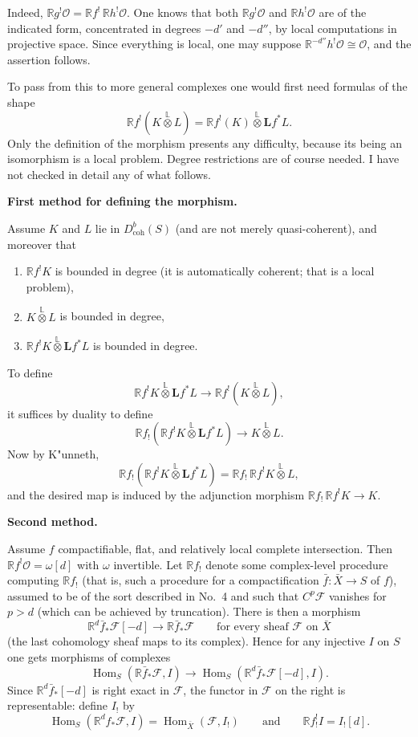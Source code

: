 \documentclass[11pt]{amsart}
\DeclareMathOperator{\Hom}{Hom}
\newcommand{\coh}{\text{coh}}
\newcommand{\cF}{\mathcal{F}}
\newcommand{\cO}{\mathcal{O}}
\newcommand{\cDb}{D^{b}}
\newcommand{\bR}{\mathbb{R}}
\newcommand{\bL}{\mathbf{L}}
\theoremstyle{plain}
\theoremstyle{definition}
\begin{document}
Indeed, $\bR g^{!}\cO=\bR f^{!}\,\bR h^{!}\cO$. One knows that both $\bR g^{!}\cO$ and $\bR h^{!}\cO$ are of the indicated form, concentrated in degrees $-d'$ and $-d''$, by local computations in projective space. Since everything is local, one may suppose $\bR^{-d''}h^{!}\cO\cong \cO$, and the assertion follows.

To pass from this to more general complexes one would first need formulas of the shape
\[
\bR f^{!}(K\overset{\mathbb L}{\otimes}L)=\bR f^{!}(K)\overset{\mathbb L}{\otimes}\bL f^*L.
\]
Only the definition of the morphism presents any difficulty, because its being an isomorphism is a local problem. Degree restrictions are of course needed. I have not checked in detail any of what follows.

\medskip
\noindent\textbf{First method for defining the morphism.}

Assume $K$ and $L$ lie in $\cDb_{\coh}(S)$ (and are not merely quasi-coherent), and moreover that
\begin{enumerate}
\item[(a)] $\bR f^{!}K$ is bounded in degree (it is automatically coherent; that is a local problem),
\item[(b)] $K\overset{\mathbb L}{\otimes}L$ is bounded in degree,
\item[(c)] $\bR f^{!}K\overset{\mathbb L}{\otimes}\bL f^*L$ is bounded in degree.
\end{enumerate}

To define
\[
\bR f^{!}K\overset{\mathbb L}{\otimes}\bL f^*L \longrightarrow \bR f^{!}(K\overset{\mathbb L}{\otimes}L),
\]
it suffices by duality to define
\[
\bR f_!(\bR f^{!}K\overset{\mathbb L}{\otimes}\bL f^*L)\longrightarrow K\overset{\mathbb L}{\otimes}L.
\]
Now by K"unneth,
\[
\bR f_!(\bR f^{!}K\overset{\mathbb L}{\otimes}\bL f^*L)=\bR f_!\,\bR f^{!}K\overset{\mathbb L}{\otimes}L,
\]
and the desired map is induced by the adjunction morphism $\bR f_!\,\bR f^{!}K\to K$.

\medskip
\noindent\textbf{Second method.}

Assume $f$ compactifiable, flat, and relatively local complete intersection. Then $\bR f^{!}\cO=\omega[d]$ with $\omega$ invertible. Let $\bR f_!$ denote some complex-level procedure computing $\bR f_!$ (that is, such a procedure for a compactification $\bar f\colon \bar X\to S$ of $f$), assumed to be of the sort described in No.~4 and such that $C^p\cF$ vanishes for $p>d$ (which can be achieved by truncation). There is then a morphism
\[
\bR^d\bar f_*\cF[-d]\to \bR\bar f_*\cF\qquad\text{for every sheaf }\cF\text{ on }\bar X
\]
(the last cohomology sheaf maps to its complex). Hence for any injective $I$ on $S$ one gets morphisms of complexes
\[
\Hom_S(\bR\bar f_*\cF,I)\to \Hom_S(\bR^d\bar f_*\cF[-d],I).
\]
Since $\bR^d\bar f_*[-d]$ is right exact in $\cF$, the functor in $\cF$ on the right is representable: define $I_!$ by
\[
\Hom_S(\bR^d f_*\cF,I)=\Hom_{\bar X}(\cF,I_!)\qquad\text{and}\qquad \bR f^{!}_{!}I=I_![d].
\]
\end{document}
